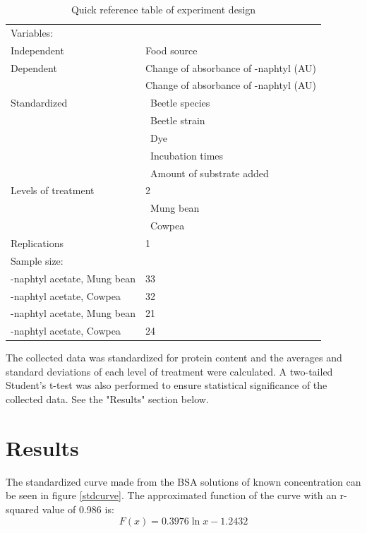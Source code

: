 \documentclass[12pt]{article}
\begin{document}
	\begin{table}[h]
		\centering
		\begin{tabular}{|l|l|}
			\hline
			Variables:&\\
			\qquad Independent & Food source \\ \hline
			\qquad Dependent & Change of absorbance of \textalpha-naphtyl (\si{AU})\\& Change of absorbance of \textbeta-naphtyl (\si{AU})\\ \hline
			\qquad Standardized & \quad\textbullet\ Beetle species\\ 
			& \quad\textbullet\ Beetle strain \\
			& \quad\textbullet\ Dye \\
			& \quad\textbullet\ Incubation times \\
			& \quad\textbullet\ Amount of substrate added\\ \hline
			Levels of treatment & 2\\
			& \quad\textbullet\ Mung bean \\
			& \quad\textbullet\ Cowpea\\ \hline
			Replications & 1 \\ \hline
			Sample size: &\\
			\qquad \textalpha-naphtyl acetate, Mung bean & 33 \\
			\qquad \textalpha-naphtyl acetate, Cowpea & 32 \\
			\qquad \textbeta-naphtyl acetate, Mung bean & 21 \\
			\qquad \textbeta-naphtyl acetate, Cowpea & 24 \\
			\hline
		\end{tabular}
		\caption{Quick reference table of experiment design}
		\label{refTable}
	\end{table}
	
	The collected data was standardized for protein content and the averages and standard deviations of each level of treatment were calculated. A two-tailed Student's t-test was also performed to ensure statistical significance of the collected data. See the "Results" section below. \newpage
	
\section{Results}
	The standardized curve made from the BSA solutions of known concentration can be seen in figure \ref{stdcurve}. The approximated function of the curve with an r-squared value of 0.986 is:
	\begin{equation}
	F(x)=0.3976\ln x-1.2432
	\end{equation}
	
\end{document}
